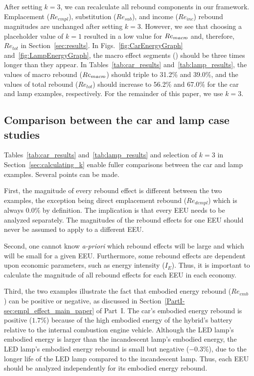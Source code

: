 \documentclass[12pt]{article}\usepackage[]{graphicx}\usepackage[]{xcolor}
\begin{document}
After setting $k = 3$,
we can recalculate all rebound components in our framework.
Emplacement ($Re_{empl}$), substitution ($Re_{sub}$), and income ($Re_{inc}$) rebound
magnitudes are unchanged after setting $k = 3$.
However, we see that choosing a placeholder value of $k = 1$
resulted in a low value for $Re_{macr\!o}$ and, therefore, $Re_{tot}$
in Section~\ref{sec:results}.
In Figs.~\ref{fig:CarEnergyGraph} and~\ref{fig:LampEnergyGraph},
the macro effect segments (\bartilde{})
should be three times longer than they appear.
In Tables~\ref{tab:car_results} and~\ref{tab:lamp_results},
the values of macro rebound ($Re_{macr\!o}$) should triple to
31.2\% and
39.0\%, and
the values of total rebound ($Re_{tot}$) should increase to
56.2\% and
67.0\%
for the car and lamp examples,
respectively.
For the remainder of this paper,
we use $k = 3$.


\subsection{Comparison between the car and lamp case studies}
\label{sec:case_study_comparison}



Tables~\ref{tab:car_results} and~\ref{tab:lamp_results}
and selection of $k = 3$ in Section~\ref{sec:calculating_k}
enable fuller comparisons between the car and lamp examples.
Several points can be made.

First,
the magnitude of every rebound effect is different between the two examples,
the exception being direct emplacement rebound ($Re_{dempl}$)
which is always 0.0\% by definition.
The implication is that every EEU needs to be analyzed separately.
The magnitudes of the rebound effects
for one EEU should never be assumed to apply to a different EEU.

Second,
one cannot know \emph{a-priori} which rebound effects
will be large and which will be small
for a given EEU.
Furthermore, some rebound effects are dependent upon economic parameters,
such as energy intensity ($I_E$).
Thus, it is important to calculate the magnitude of all rebound effects
for each EEU in each economy.

Third,
the two examples illustrate the fact that
embodied energy rebound ($Re_{emb}$) can be positive or negative,
as discussed in Section~\ref{PartI-sec:empl_effect_main_paper} of Part~I.
The car's embodied energy rebound is positive ($1.7$\%)
because of the high embodied energy of the hybrid's battery
relative to the internal combustion engine vehicle.
Although the LED lamp's embodied energy is larger than the
incandescent lamp's embodied energy,
the LED lamp's embodied energy rebound is
small but negative ($-0.3$\%),
due to the longer life of the LED lamp compared to the incandescent lamp.
Thus, each EEU should be analyzed independently for its embodied energy rebound.
\end{document}
